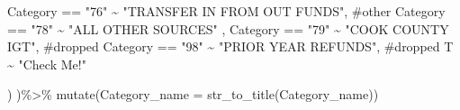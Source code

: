 \documentclass[
  letterpaper,
  DIV=11,
  numbers=noendperiod]{scrreport}
\newenvironment{Shaded}{\begin{snugshade}}{\end{snugshade}}
\newcommand{\AttributeTok}[1]{\textcolor[rgb]{0.40,0.45,0.13}{#1}}
\newcommand{\CommentTok}[1]{\textcolor[rgb]{0.37,0.37,0.37}{#1}}
\newcommand{\FunctionTok}[1]{\textcolor[rgb]{0.28,0.35,0.67}{#1}}
\newcommand{\NormalTok}[1]{\textcolor[rgb]{0.00,0.23,0.31}{#1}}
\newcommand{\SpecialCharTok}[1]{\textcolor[rgb]{0.37,0.37,0.37}{#1}}
\newcommand{\StringTok}[1]{\textcolor[rgb]{0.13,0.47,0.30}{#1}}
\begin{document}
\begin{Shaded}
\begin{Highlighting}[]
\NormalTok{    Category }\SpecialCharTok{==} \StringTok{"76"} \SpecialCharTok{\textasciitilde{}}  \StringTok{"TRANSFER IN FROM OUT FUNDS"}\NormalTok{,  }\CommentTok{\#other}
\NormalTok{    Category }\SpecialCharTok{==} \StringTok{"78"} \SpecialCharTok{\textasciitilde{}}  \StringTok{"ALL OTHER SOURCES"}\NormalTok{ ,}
\NormalTok{    Category }\SpecialCharTok{==} \StringTok{"79"} \SpecialCharTok{\textasciitilde{}}   \StringTok{"COOK COUNTY IGT"}\NormalTok{, }\CommentTok{\#dropped}
\NormalTok{    Category }\SpecialCharTok{==} \StringTok{"98"} \SpecialCharTok{\textasciitilde{}}  \StringTok{"PRIOR YEAR REFUNDS"}\NormalTok{, }\CommentTok{\#dropped}
\NormalTok{                 T }\SpecialCharTok{\textasciitilde{}} \StringTok{"Check Me!"}

\NormalTok{  ) )}\SpecialCharTok{\%\textgreater{}\%} 
  \FunctionTok{mutate}\NormalTok{(}\AttributeTok{Category\_name =} \FunctionTok{str\_to\_title}\NormalTok{(Category\_name))}



\end{Highlighting}
\end{Shaded}
\end{document}

